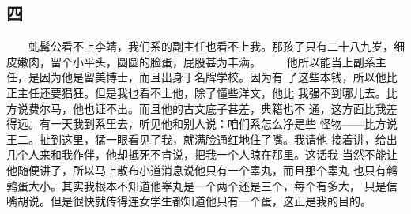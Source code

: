  
\subsection{四} 
 
 　　虬髯公看不上李靖，我们系的副主任也看不上我。那孩子只有二十八九岁，细 皮嫩肉，留个小平头，圆圆的脸蛋，屁股甚为丰满。 　　他所以能当上副系主任，是因为他是留美博士，而且出身于名牌学校。因为有 了这些本钱，所以他比正主任还要猖狂。但是我也看不上他，除了懂些洋文，他比 我强不到哪儿去。比方说费尔马，他也证不出。而且他的古文底子甚差，典籍也不 通，这方面比我差得远。有一天我到系里去，听见他和别人说：咱们系怎么净是些 怪物——比方说王二。扯到这里，猛一眼看见了我，就满脸通红地住了嘴。我请他 接着讲，给出几个人来和我作伴，他却抵死不肯说，把我一个人晾在那里。这话我 当然不能让他随便讲了，所以马上散布小道消息说他只有一个睾丸，而且那个睾丸 也只有鹌鹑蛋大小。其实我根本不知道他睾丸是一个两个还是三个，每个有多大， 只是信嘴胡说。但是很快就传得连女学生都知道他只有一个蛋，这正是我的目的。 
 

